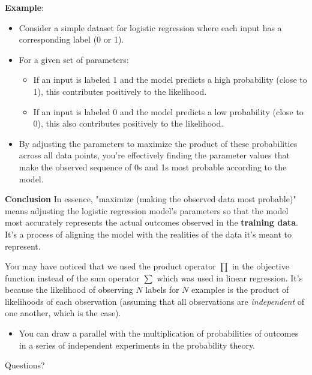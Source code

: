 \documentclass[9pt,dvipsnames]{beamer}
\begin{document}
\begin{frame}{}
	\textbf{Example}:
	
	\begin{itemize}
		\item Consider a simple dataset for logistic regression where each input has a corresponding label (0 or 1).
		\item For a given set of parameters:
		\begin{itemize}
			\item If an input is labeled 1 and the model predicts a high probability (close to 1), this contributes positively to the likelihood.
			\item If an input is labeled 0 and the model predicts a low probability (close to 0), this also contributes positively to the likelihood.
		\end{itemize}
		\item By adjusting the parameters to maximize the product of these probabilities across all data points, you're effectively finding the parameter values that make the observed sequence of 0s and 1s most probable according to the model.
	\end{itemize}
	\textbf{Conclusion}
	In essence, "maximize (making the observed data most probable)" means adjusting the logistic regression model's parameters so that the model most accurately represents the actual outcomes observed in the \textbf{training data}. It's a process of aligning the model with the realities of the data it's meant to represent.
\end{frame}

\begin{frame}
	You may have noticed that we used the product operator $\prod$ in the objective function instead of the sum operator $\sum$ which was used in linear regression. It's because the likelihood of observing $N$ labels for $N$ examples is the product of likelihoods of each observation (assuming that all observations are \textit{independent} of one another, which is the case). 
	\begin{itemize}
		\item You can draw a parallel with the multiplication of probabilities of outcomes in a series of independent experiments in the probability theory.
	\end{itemize}

\end{frame}

\begin{frame}
    \begin{center}
        \Huge Questions?
    \end{center}
\end{frame}
\end{document}
